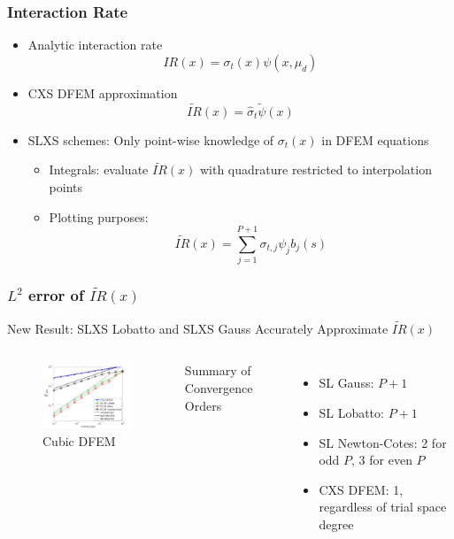 \documentclass{beamer}
\newcommand{\be}{\begin{equation*}}   %
\newcommand{\ee}{\end{equation*}}
\newcommand{\B}[1]{\ensuremath{b_{#1} }}			%
\begin{document}
\begin{frame}
\frametitle{Interaction Rate}
\begin{itemize}
\item Analytic interaction rate
\be
 IR(x) = \sigma_t(x) \psi(x,\mu_d)
\ee
\item CXS DFEM approximation
\be
\widetilde{IR}(x) = \hat{\sigma}_t \widetilde{\psi}(x)
\ee
\item SLXS schemes:  Only point-wise knowledge of $\sigma_t(x)$ in DFEM equations
\begin{itemize}
\item Integrals: evaluate $\widetilde{IR}(x)$ with quadrature restricted to interpolation points
\item Plotting purposes:
\be
\widetilde{IR}(x) = \sum_{j=1}^{P+1}{ \sigma_{t,j} \psi_j \B{j}(s) } 
\ee
\end{itemize}
\end{itemize}
\end{frame}

\begin{frame}
\frametitle{$L^2$ error of $\widetilde{IR}(x)$}

New Result: SLXS Lobatto and SLXS Gauss Accurately Approximate $\widetilde{IR}(x)$
\begin{columns}[c]
\begin{figure}
\includegraphics[width = 5cm]{../chapter3_variable_xs/P3_VarXS_E_I_L2.png}
\caption{Cubic DFEM}
\end{figure}
Summary of Convergence Orders
\begin{itemize}
\item SL Gauss: $P+1$
\item SL Lobatto: $P+1$
\item SL Newton-Cotes: 2 for odd $P$, 3 for even $P$
\item CXS DFEM: 1, regardless of trial space degree
\end{itemize}
\end{columns}
\end{frame}
\end{document}
